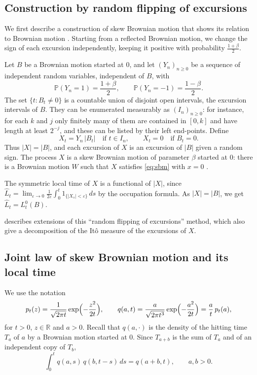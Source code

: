 \subsection{Construction by random flipping of excursions}
We first describe a construction of skew Brownian motion that shows its
relation to Brownian motion \citep[see][Chapter~XII, Exercise~2.16]{RevuzYor1999}.
Starting from a reflected Brownian motion, we change the sign of each excursion
independently, keeping it positive with probability $\frac{1+\beta}{2}$.

Let $B$ be a Brownian motion started at $0$, and let $(Y_n)_{n\geqslant0}$ be
a sequence of independent random variables, independent of $B$, with
\[
	\mathbb{P}(Y_n = 1) = \frac{1+\beta}{2}, \qquad \mathbb{P}(Y_n = -1) = \frac{1-\beta}{2}.
\]
The set $\{t : B_t\neq0\}$ is a countable union of disjoint open intervals, the
excursion intervals of $B$. They can be enumerated measurably as
$(I_n)_{n\geqslant0}$: for instance, for each $k$ and $j$ only finitely many
of them are contained in $[0,k]$ and have length at least $2^{-j}$, and these
can be listed by their left end-points. Define
\[
	X_t = Y_n\,|B_t| \quad\text{if } t\in I_n, \qquad X_t = 0 \quad\text{if } B_t = 0 .
\]
Thus $|X| = |B|$, and each excursion of $X$ is an excursion of $|B|$ given a
random sign. The process $X$ is a skew Brownian motion of parameter $\beta$
started at $0$: there is a Brownian motion $W$ such that $X$ satisfies
\eqref{eq:sbm} with $x = 0$ \citep{HarrisonShepp1981,Lejay2006}.

The symmetric local time of $X$ is a functional of $|X|$, since
$\hat{L}_t = \lim_{\varepsilon\to0}\frac{1}{2\varepsilon}\int_0^t1_{\{|X_s|<\varepsilon\}}\,ds$
by the occupation formula. As $|X| = |B|$, we get
$\hat{L}_t = L^0_t(B)$.

\begin{remark}
	\citet{Lejay2006} describes extensions of this ``random flipping of
	excursions'' method, which also give a decomposition of the Itô measure of
	the excursions of $X$.
\end{remark}

\subsection{Joint law of skew Brownian motion and its local time}

We use the notation
\[
	p_t(z) = \frac{1}{\sqrt{2\pi t}}\exp\Bigl(-\frac{z^2}{2t}\Bigr),
	\qquad
	q(a,t) = \frac{a}{\sqrt{2\pi t^3}}\exp\Bigl(-\frac{a^2}{2t}\Bigr) = \frac{a}{t}\,p_t(a),
\]
for $t>0$, $z\in\mathbb{R}$ and $a>0$. Recall that $q(a,\cdot)$ is the density
of the hitting time $T_a$ of $a$ by a Brownian motion started at $0$. Since
$T_{a+b}$ is the sum of $T_a$ and of an independent copy of $T_b$,
\begin{equation}\label{eq:q-conv}
	\int_0^t q(a,s)\,q(b,t-s)\,ds = q(a+b,t), \qquad a,b>0 .
\end{equation}

